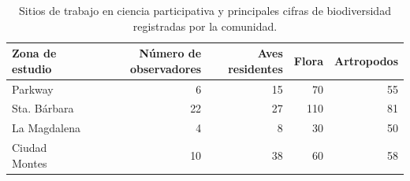 \begin{table}
\centering
\begin{tabular}{lrrrr}
\toprule
Zona de estudio & Número de observadores & Aves residentes & Flora & Artropodos \\
\midrule
Parkway & 6 & 15 & 70 & 55 \\
Sta. Bárbara & 22 & 27 & 110 & 81 \\
La Magdalena & 4 & 8 & 30 & 50 \\
Ciudad Montes & 10 & 38 & 60 & 58 \\
\bottomrule
\end{tabular}
\caption[Sitios de trabajo]{Sitios de trabajo en ciencia participativa y principales cifras de biodiversidad registradas por la comunidad.}
\label{bcp_tab}
\end{table}
